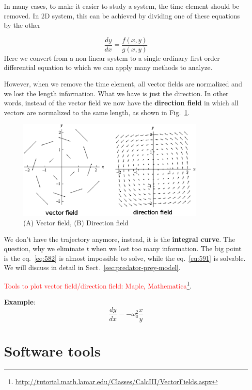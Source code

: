In many cases, to make it easier to study a system, the time element
should be removed.  In 2D system, this can be achieved by dividing one
of these equations by the other

\begin{equation}
  \label{eq:591}
  \frac{dy}{dx} = \frac{f(x,y)}{g(x,y)}
\end{equation}
Here we convert from a non-linear system to a single ordinary
first-order differential equation to which we can apply many methods
to analyze.

However, when we remove the time element, all vector fields are
normalized and we lost the length information. What we have is just
the direction. In other words, instead of the vector field we now have
the {\bf direction field} in which all vectors are normalized to the
same length, as shown in Fig.~\ref{fig:vector_field}.

\begin{figure}[hbt]
  \centerline{\includegraphics[height=5cm,
    angle=0]{./images/vector_field.eps}}
  \caption{(A) Vector field, (B) Direction field}
  \label{fig:vector_field}
\end{figure}

We don't have the trajectory anymore, instead, it is the
{\bf integral curve}. The question, why we eliminate $t$ when we lost
too many information. The big point is the eq.~\eqref{eq:582} is
almost impossible to solve, while the eq.~\eqref{eq:591} is
solvable. We will discuss in detail in
Sect.~\ref{sec:predator-prey-model}.

\textcolor{red}{Tools to plot vector field/direction field: Maple,
  Mathematica}\footnote{\url{http://tutorial.math.lamar.edu/Classes/CalcIII/VectorFields.aspx}}. 

{\bf Example}:
\begin{equation}
  \label{eq:368}
  \frac{dy}{dx} = -\omega_0^2\frac{x}{y}
\end{equation}


\section{Software tools}
\label{sec:software-tools}


